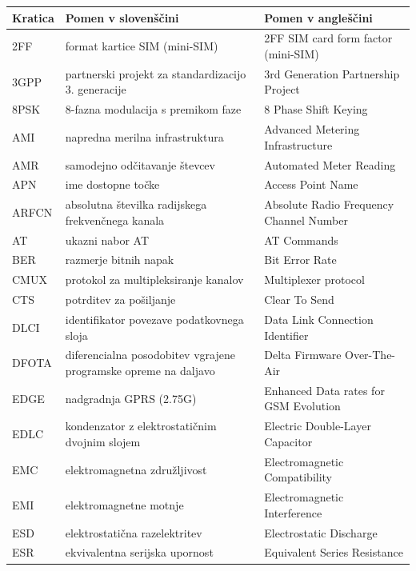 \documentclass[a4paper,twoside,openright,12pt,slovene]{book}
\begin{document}
\begin{center}
    \begin{longtable}{p{2.5cm}|p{5.75cm}|p{5.75cm}} \hline %
        Kratica & Pomen v slovenščini & Pomen v angleščini \\ \hline\endhead %
        \hline\endfoot %
2FF    & format kartice SIM (mini-SIM) & 2FF SIM card form factor (mini-SIM) \\
3GPP   & partnerski projekt za standardizacijo 3. generacije & 3rd Generation Partnership Project \\
8PSK   & 8-fazna modulacija s premikom faze & 8 Phase Shift Keying \\
AMI    & napredna merilna infrastruktura & Advanced Metering Infrastructure \\
AMR    & samodejno odčitavanje števcev & Automated Meter Reading \\
APN    & ime dostopne točke & Access Point Name \\
ARFCN  & absolutna številka radijskega frekvenčnega kanala & Absolute Radio Frequency Channel Number \\
AT     & ukazni nabor AT & AT Commands \\
BER    & razmerje bitnih napak & Bit Error Rate \\
CMUX   & protokol za multipleksiranje kanalov & Multiplexer protocol \\
CTS    & potrditev za pošiljanje & Clear To Send \\
DLCI   & identifikator povezave podatkovnega sloja & Data Link Connection Identifier \\
DFOTA  & diferencialna posodobitev vgrajene programske opreme na daljavo & Delta Firmware Over-The-Air \\
EDGE   & nadgradnja GPRS (2.75G) & Enhanced Data rates for GSM Evolution \\
EDLC   & kondenzator z elektrostatičnim dvojnim slojem & Electric Double-Layer Capacitor \\
EMC    & elektromagnetna združljivost & Electromagnetic Compatibility \\
EMI    & elektromagnetne motnje & Electromagnetic Interference \\
ESD    & elektrostatična razelektritev & Electrostatic Discharge \\
ESR    & ekvivalentna serijska upornost & Equivalent Series Resistance \\

\end{longtable}
\end{center}
\end{document}
